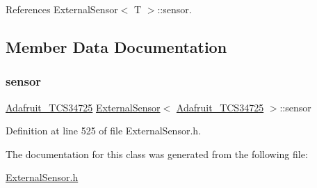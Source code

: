 References External\+Sensor$<$ T $>$\+::sensor.



\subsection{Member Data Documentation}
\mbox{\label{class_external_sensor_3_01_adafruit___t_c_s34725_01_4_aa1c5cc9eec53c08392f63346c9a4cd47}} 
\subsubsection{\texorpdfstring{sensor}{sensor}}
{\footnotesize\ttfamily \hyperlink{class_adafruit___t_c_s34725}{Adafruit\+\_\+\+T\+C\+S34725} \hyperlink{class_external_sensor}{External\+Sensor}$<$ \hyperlink{class_adafruit___t_c_s34725}{Adafruit\+\_\+\+T\+C\+S34725} $>$\+::sensor\hspace{0.3cm}{\ttfamily [private]}}



Definition at line 525 of file External\+Sensor.\+h.



The documentation for this class was generated from the following file\+:\begin{DoxyCompactItemize}
\item 
\hyperlink{_external_sensor_8h}{External\+Sensor.\+h}\end{DoxyCompactItemize}
